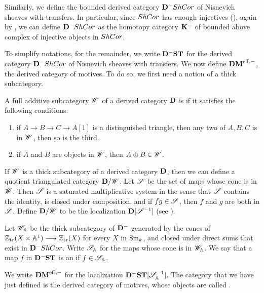 Similarly, we define the bounded derived category $\DCat^- \ShCor$
of Nisnevich sheaves with transfers. In particular, since $\ShCor$
has enough injectives (\cite[13.1]{MVW}), again by 
\cite[10.4.8]{WH}, we can define $\DCat^-\ShCor$ as the homotopy
category $\DCat[K]^-$ of bounded above complex of injective objects
in $\ShCor$. 

To simplify notations, for the remainder, we write $\DShCor$ for 
the derived category $\DCat^-\ShCor$ of Nisnevich sheaves with 
transfers. We now define $\DMeff$, the derived category of 
motives. To do so, we first need a notion of a thick subcategory.

\begin{defn}
A full additive subcategory $\Cat{W}$ of a derived category 
$\DCat$ is  if it satisfies the following conditions:
\begin{enumerate}
\item if $A \to B \to C \to A[1]$ is a distinguished triangle, then
any two of $A, B, C$ is in $\Cat{W}$, then so is the third.

\item if $A$ and $B$ are objects in $\Cat{W}$, then $A \oplus B \in
\Cat{W}$.
\end{enumerate}
\end{defn}

If $\Cat{W}$ is a thick subcategory of a derived category $\DCat$,
then we can define a quotient triangulated category 
$\DCat/\Cat{W}$. Let $\Cat{S}$ be the set of maps whose cone is in 
$\Cat{W}$. Then $\Cat{S}$ is a saturated multiplicative system in 
the sense that $\Cat{S}$ contains the identity, is closed under 
composition, and if $fg \in \Cat{S}$, then $f$ and $g$ are both in 
$\Cat{S}$. Define $\DCat/\Cat{W}$ to be the localization 
$\DCat[D] [\Cat{S}^{-1}]$ (see \cite{Verd96}).

\begin{defn}\label{def_DMeff}
Let $\Cat{W}_{\A}$ be the thick subcategory of $\DCat^-$ generated 
by the cones of $\Ztr(X \times \A^1) \to \Ztr(X)$ for every $X$ in 
$\Sm$, and closed under direct sums that exist in $\DCat^-\ShCor$. 
Write $\Cat{S}_{\A}$ for the maps whose cone is in $\Cat{W}_{\A}$. 
We say that a map $f$ in $\DShCor$ is an  if $f \in \Cat{S}_{\A}$.

We write $\DMeff$ for the localization 
$\DShCor [\Cat{S}_{\A}^{-1}]$. The category that we have
just defined is the derived category of motives, whose objects are
called .
\end{defn}

